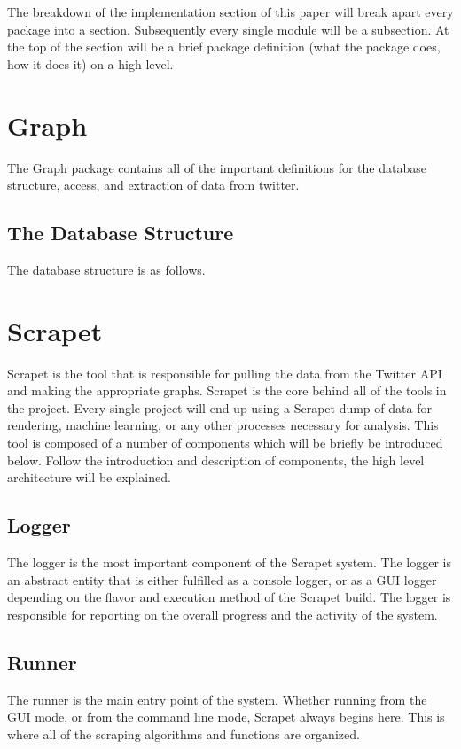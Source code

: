 The breakdown of the implementation section of this paper will break apart every package into a section. Subsequently every single module will be a subsection. At the top of the section will be a brief package definition (what the package does, how it does it) on a high level.
\section{Graph}
The Graph package contains all of the important definitions for the database structure, access, and extraction of data from twitter.
\subsection{The Database Structure}
The database structure is as follows.

\section{Scrapet}
Scrapet is the tool that is responsible for pulling the data from the Twitter API and making the appropriate graphs. Scrapet is the core behind all of the tools in the project. Every single project will end up using a Scrapet dump of data for rendering, machine learning, or any other processes necessary for analysis. This tool is composed of a number of components which will be briefly be introduced below. Follow the introduction and description of components, the high level architecture will be explained.
\subsection{Logger}
The logger is the most important component of the Scrapet system. The logger is an abstract entity that is either fulfilled as a console logger, or as a GUI logger depending on the flavor and execution method of the Scrapet build. The logger is responsible for reporting on the overall progress and the activity of the system.
\subsection{Runner}
The runner is the main entry point of the system. Whether running from the GUI mode, or from the command line mode, Scrapet always begins here. This is where all of the scraping algorithms and functions are organized.
